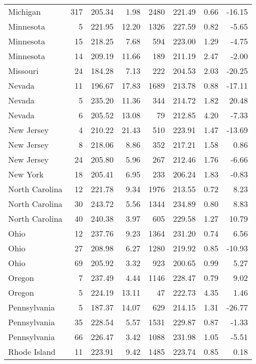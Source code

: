 \begin{longtable}{lrrr@{\extracolsep{10pt}}rrrr}
  Michigan & 317 & 205.34 & 1.98 & 2480 & 221.49 & 0.66 & -16.15 \\ 
  Minnesota &   5 & 221.95 & 12.20 & 1326 & 227.59 & 0.82 & -5.65 \\ 
  Minnesota &  15 & 218.25 & 7.68 & 594 & 223.00 & 1.29 & -4.75 \\ 
  Minnesota &  14 & 209.19 & 11.66 & 189 & 211.19 & 2.47 & -2.00 \\ 
  Missouri &  24 & 184.28 & 7.13 & 222 & 204.53 & 2.03 & -20.25 \\ 
  Nevada &  11 & 196.67 & 17.83 & 1689 & 213.78 & 0.88 & -17.11 \\ 
  Nevada &   5 & 235.20 & 11.36 & 344 & 214.72 & 1.82 & 20.48 \\ 
  Nevada &   6 & 205.52 & 13.08 &  79 & 212.85 & 4.20 & -7.33 \\ 
  New Jersey &   4 & 210.22 & 21.43 & 510 & 223.91 & 1.47 & -13.69 \\ 
  New Jersey &   8 & 218.06 & 8.86 & 352 & 217.21 & 1.58 & 0.86 \\ 
  New Jersey &  24 & 205.80 & 5.96 & 267 & 212.46 & 1.76 & -6.66 \\ 
  New York &  18 & 205.41 & 6.95 & 233 & 206.24 & 1.83 & -0.83 \\ 
  North Carolina &  12 & 221.78 & 9.34 & 1976 & 213.55 & 0.72 & 8.23 \\ 
  North Carolina &  30 & 243.72 & 5.56 & 1344 & 234.89 & 0.80 & 8.83 \\ 
  North Carolina &  40 & 240.38 & 3.97 & 605 & 229.58 & 1.27 & 10.79 \\ 
  Ohio &  12 & 237.76 & 9.23 & 1364 & 231.20 & 0.74 & 6.56 \\ 
  Ohio &  27 & 208.98 & 6.27 & 1280 & 219.92 & 0.85 & -10.93 \\ 
  Ohio &  69 & 205.92 & 3.32 & 923 & 200.65 & 0.99 & 5.27 \\ 
  Oregon &   7 & 237.49 & 4.44 & 1146 & 228.47 & 0.79 & 9.02 \\ 
  Oregon &   5 & 224.19 & 13.11 &  47 & 222.73 & 4.35 & 1.46 \\ 
  Pennsylvania &   5 & 187.37 & 14.07 & 629 & 214.15 & 1.31 & -26.77 \\ 
  Pennsylvania &  35 & 228.54 & 5.57 & 1531 & 229.87 & 0.87 & -1.33 \\ 
  Pennsylvania &  66 & 226.47 & 3.42 & 1088 & 231.98 & 1.05 & -5.51 \\ 
  Rhode Island &  11 & 223.91 & 9.42 & 1485 & 223.74 & 0.85 & 0.18 \\ 

\end{longtable}
